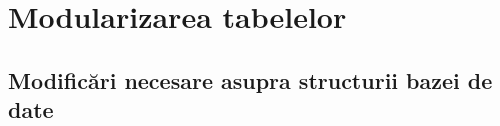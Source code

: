 \section{Modularizarea tabelelor}
	\subsection{Modificări necesare asupra structurii bazei de date}
